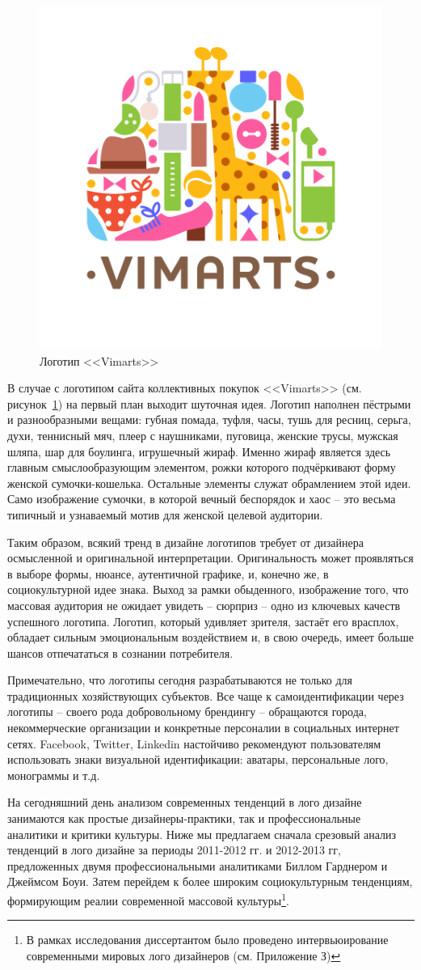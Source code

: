 \begin{figure}[h!]
  \centering
  \includegraphics[width=.3\linewidth]{images/vimarts}
  \caption{Логотип <<Vimarts>>}
  \label{fig:vimarts}
\end{figure}

В случае с логотипом сайта коллективных покупок <<Vimarts>> (см. рисунок~\ref{fig:vimarts}) на первый план выходит шуточная идея. Логотип наполнен пёстрыми и разнообразными вещами: губная помада, туфля, часы, тушь для ресниц, серьга, духи, теннисный мяч, плеер с наушниками, пуговица, женские трусы, мужская шляпа, шар для боулинга, игрушечный жираф. Именно жираф является здесь главным смыслообразующим элементом, рожки которого подчёркивают форму женской сумочки-кошелька. Остальные элементы служат обрамлением этой идеи. Само изображение сумочки, в которой вечный беспорядок и хаос -- это весьма типичный и узнаваемый мотив для женской целевой аудитории.

Таким образом, всякий тренд в дизайне логотипов требует от дизайнера осмысленной и оригинальной интерпретации. Оригинальность может проявляться в выборе формы, нюансе, аутентичной графике, и, конечно же, в социокультурной идее знака. Выход за рамки обыденного, изображение того, что массовая аудитория не ожидает увидеть -- сюрприз -- одно из ключевых качеств успешного логотипа. Логотип, который удивляет зрителя, застаёт его врасплох, обладает сильным эмоциональным воздействием и, в свою очередь, имеет больше шансов отпечататься в сознании потребителя.

Примечательно, что логотипы сегодня разрабатываются не только для традиционных хозяйствующих субъектов. Все чаще к самоидентификации через логотипы -- своего рода добровольному брендингу -- обращаются города, некоммерческие организации и  конкретные персоналии в социальных интернет сетях. Facebook, Twitter, Linkedin настойчиво рекомендуют пользователям использовать знаки визуальной идентификации: аватары, персональные лого, монограммы и т.д.

На сегодняшний день анализом современных тенденций в лого дизайне занимаются как простые дизайнеры-практики, так и профессиональные аналитики и критики культуры. Ниже мы предлагаем сначала срезовый анализ тенденций в
лого дизайне за периоды 2011-2012 гг. и 2012-2013 гг,  предложенных двумя профессиональными
аналитиками Биллом Гарднером и Джеймсом Боуи. Затем перейдем к более широким социокультурным
тенденциям, формирующим реалии современной массовой культуры\footnote{В рамках исследования диссертантом было проведено интервьюирование современными мировых лого дизайнеров (см. Приложение З)}.

